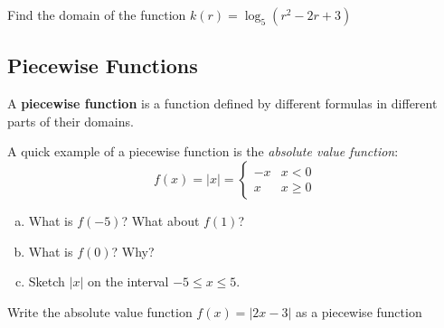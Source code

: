 \documentclass[notes]{subfiles}
\begin{document}
		\begin{ex}
			Find the domain of the function \(k(r) = \log_5(r^2 -2r+3)\)
		\end{ex}
			\newpage
			
	\subsection*{Piecewise Functions}
		\begin{defn}
			A \textbf{piecewise function} is a function defined by different formulas in different parts of their domains.
		\end{defn}
						
		\begin{ex}
			A quick example of a piecewise function is the \emph{absolute value function}: 
				\[f(x) = |x| = \begin{cases}-x & x < 0 \\x & x \geq 0  \end{cases}\]
				
			\begin{enumerate}[(a)]
				\item What is \(f(-5)\)? What about \(f(1)\)?
					
				\item What is \(f(0)\)?  Why?
					
				\item Sketch \(|x|\) on the interval \(-5\leq x \leq 5\).
			\end{enumerate}
		\end{ex}
			
		\begin{ex}
			Write the absolute value function \(f(x) = |2x-3|\) as a piecewise function
		\end{ex}
			\newpage
			
\end{document}

